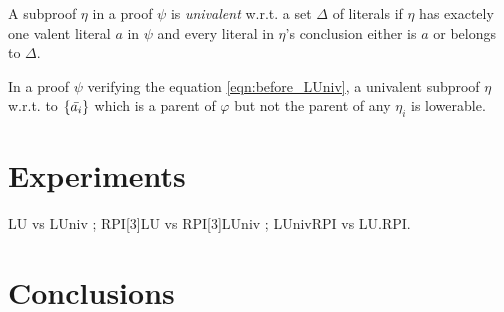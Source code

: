 \documentclass{llncs}
\begin{document}
\begin{definition}
A subproof $\eta$ in a proof $\psi$ is \emph{univalent} w.r.t. a set $\Delta$ of literals if $\eta$ has
exactely one valent literal $a$ in $\psi$ and every literal in $\eta$'s conclusion either is $a$ or
belongs to $\Delta$.
\end{definition}

In a proof $\psi$ verifying the equation \ref{eqn:before_LUniv}, a univalent subproof $\eta$ w.r.t. to
$\{\bar{a_i}\}$ which is a parent of $\varphi$ but not the parent of any $\eta_i$ is lowerable.


\section{Experiments}



\begin{jb}
LU vs LUniv ; RPI[3]LU vs RPI[3]LUniv ; LUnivRPI vs LU.RPI.
\end{jb}

\section{Conclusions}



\end{document}
